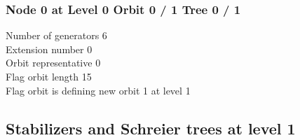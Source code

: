 \subsubsection*{Node 0 at Level 0 Orbit 0 / 1 Tree 0 / 1}
Number of generators 6\\

\noindent Extension number 0\\
Orbit representative 0\\
Flag orbit length 15\\
Flag orbit is defining new orbit 1 at level 1\\

\subsection{Stabilizers and Schreier trees at level 1}

